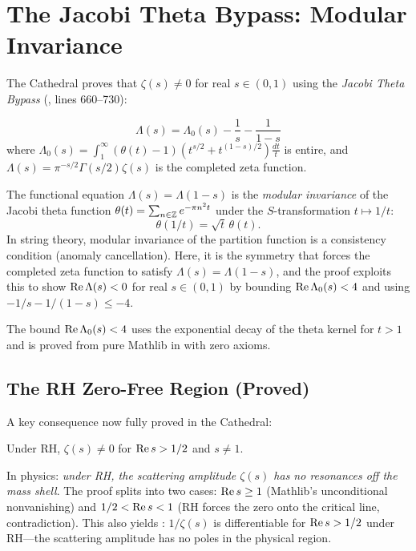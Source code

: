 \documentclass[11pt,a4paper]{article}
\begin{document}
\section{The Jacobi Theta Bypass: Modular Invariance}
\label{sec:theta}

The Cathedral proves that $\zeta(s) \neq 0$ for real $s \in (0,1)$
using the \emph{Jacobi Theta Bypass} (, lines 660--730):

\[
  \Lambda(s) = \Lambda_0(s) - \frac{1}{s} - \frac{1}{1-s}
\]
where $\Lambda_0(s) = \int_1^\infty (\theta(t) - 1)(t^{s/2} + t^{(1-s)/2})\frac{dt}{t}$
is entire, and $\Lambda(s) = \pi^{-s/2}\Gamma(s/2)\zeta(s)$ is the
completed zeta function.

\begin{principle}
The functional equation $\Lambda(s) = \Lambda(1-s)$ is the
\emph{modular invariance} of the Jacobi theta function
$\theta(t) = \sum_{n \in \mathbb{Z}} e^{-\pi n^2 t}$ under the
$S$-transformation $t \mapsto 1/t$:
\[
  \theta(1/t) = \sqrt{t}\,\theta(t).
\]
In string theory, modular invariance of the partition function is a
consistency condition (anomaly cancellation). Here, it is the
symmetry that forces the completed zeta function to satisfy
$\Lambda(s) = \Lambda(1-s)$, and the proof exploits this to show
$\operatorname{Re}\Lambda(s) < 0$ for real $s \in (0,1)$ by bounding
$\operatorname{Re}\Lambda_0(s) < 4$ and using $-1/s - 1/(1-s) \leq -4$.
\end{principle}

The bound $\operatorname{Re}\Lambda_0(s) < 4$ uses the exponential decay of the
theta kernel for $t > 1$ and is proved from pure Mathlib in
 with zero axioms.

\subsection{The RH Zero-Free Region (Proved)}

A key consequence now fully proved in the Cathedral:

\begin{theorem}
Under RH, $\zeta(s) \neq 0$ for $\operatorname{Re} s > 1/2$ and $s \neq 1$.
\end{theorem}

In physics: \emph{under RH, the scattering amplitude $\zeta(s)$ has
no resonances off the mass shell}. The proof splits into two cases:
$\operatorname{Re} s \geq 1$ (Mathlib's unconditional nonvanishing) and
$1/2 < \operatorname{Re} s < 1$ (RH forces the zero onto the critical line,
contradiction). This also yields :
$1/\zeta(s)$ is differentiable for $\operatorname{Re} s > 1/2$ under RH---the
scattering amplitude has no poles in the physical region.
\end{document}
